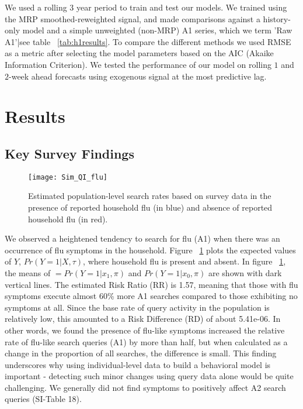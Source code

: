 \documentclass[fleqn,10pt]{wlscirep}
\begin{document}
We used a rolling $3$ year period to train and test our models. We trained using the MRP smoothed-reweighted signal, and made comparisons against a history-only model and a simple unweighted (non-MRP) A1 series, which we term 'Raw A1'|see table ~\ref{tab:h1results}. To compare the different methods we used RMSE as a metric after selecting the model parameters based on the AIC (Akaike Information Criterion). We tested the performance of our model on rolling $1$ and $2$-week ahead forecasts using exogenous signal at the most predictive lag.

\section*{Results}

\subsection*{Key Survey Findings}

\begin{figure}%
\centering
\texttt{[image: Sim\_QI\_flu]}
\caption{Estimated population-level search rates based on survey data in the presence of reported household flu (in blue) and absence of reported household flu (in red).}
\label{fig:A1search}
\end{figure}

We observed a heightened tendency to search for flu (A1) when there was an occurrence of flu symptoms in the household. Figure ~\ref{fig:A1search} plots the expected values of $Y$, $Pr(Y=1|X, \tau)$, where household flu is present and absent. In figure ~\ref{fig:A1search}, the means of $ = Pr(Y=1|x_1, \pi)$ and $ Pr(Y=1|x_0, \pi) $ are shown with dark vertical lines. The estimated Risk Ratio (RR) is 1.57, meaning that those with flu symptoms execute almost 60\% more A1 searches compared to those exhibiting no symptoms at all. Since the base rate of query activity in the population is relatively low, this amounted to a Risk Difference (RD) of about 5.41e-06. In other words, we found the presence of flu-like symptoms increased the relative rate of flu-like search queries (A1) by more than half, but when calculated as a change in the proportion of all searches, the difference is small. This finding underscores why using individual-level data to build a behavioral model is important - detecting such minor changes using query data alone would be quite challenging. We generally did not find symptoms to positively affect A2 search queries (SI-Table 18).
\end{document}
